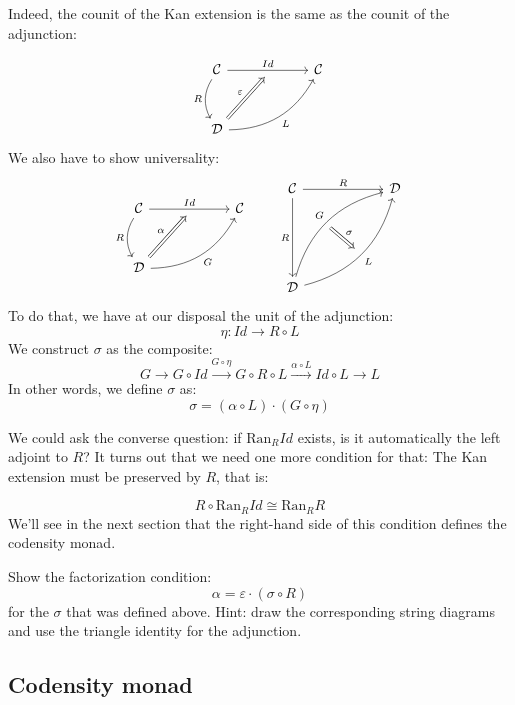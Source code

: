 \documentclass[DaoFP]{subfiles}
\begin{document}
 Indeed, the counit of the Kan extension is the same as the counit of the adjunction:

 \[
 \begin{tikzcd} [row sep=1cm, column sep=1cm]
 \cat C
 \arrow[rr, "Id", "" {name=ID, below} ]
 \arrow[d, bend right, "R"']
 && \cat C
 \\
 \cat D
  \arrow[urr, bend right, "L"']
 \arrow[Rightarrow, "\varepsilon",  to=ID]
 \end{tikzcd}
\]
We also have to show universality:
\[
 \begin{tikzcd} [row sep=1cm, column sep=1cm]
 \cat C
 \arrow[rr, "Id", "" {name=ID, below} ]
 \arrow[d, bend right, "R"']
 && \cat C
 \\
 \cat D
  \arrow[urr, bend right, "G"']
 \arrow[Rightarrow, "\alpha",  to=ID]
 \end{tikzcd}
 \qquad %
\begin{tikzcd}[row sep=2cm, column sep=2cm]
\cat C  \ar[d, "R"', "" {name=P}]
            \ar[r, "R", ""  {name=F, below, near start, bend right}]
&
\cat D
\\
\cat D
    \ar[ur, bend left, "G", "" {name=G, below}]
    \ar[ur, bend right, "L"', "" {name=Ran}]
\arrow[Rightarrow, "\sigma", from=G, to=Ran]
\end{tikzcd}
\]
To do that, we have at our disposal the unit of the adjunction:
\[ \eta \colon Id \to R \circ L \]
We construct $\sigma$ as the composite:
\[ G \rightarrow G \circ Id \xrightarrow{G \circ \eta} G \circ R \circ L \xrightarrow{\alpha \circ L} Id \circ L \rightarrow L\]
In other words, we define $\sigma$ as:
\[ \sigma = (\alpha \circ L) \cdot (G \circ \eta) \]

We could ask the converse question: if $\text{Ran}_R Id$ exists, is it automatically the left adjoint to $R$? It turns out that we need one more condition for that: The Kan extension must be preserved by $R$, that is:

\[ R \circ \text{Ran}_R Id \cong \text{Ran}_R R \]
We'll see in the next section that the right-hand side of this condition defines the codensity monad.

\begin{exercise}
Show the factorization condition: 
\[ \alpha = \varepsilon \cdot (\sigma \circ R) \]
for the $\sigma$ that was defined above. Hint: draw the corresponding string diagrams and use the triangle identity for the adjunction.
\end{exercise}

 \subsection{Codensity monad}
 
\end{document}
